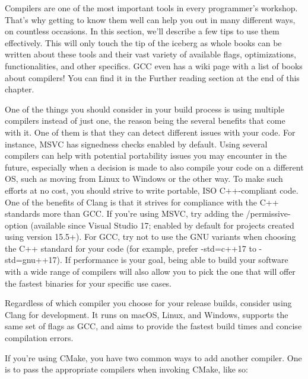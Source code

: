 
Compilers are one of the most important tools in every programmer's workshop. That's why getting to know them well can help you out in many different ways, on countless occasions. In this section, we'll describe a few tips to use them effectively. This will only touch the tip of the iceberg as whole books can be written about these tools and their vast variety of available flags, optimizations, functionalities, and other specifics. GCC even has a wiki page with a list of books about compilers! You can find it in the Further reading section at the end of this chapter.


One of the things you should consider in your build process is using multiple compilers instead of just one, the reason being the several benefits that come with it. One of them is that they can detect different issues with your code. For instance, MSVC has signedness checks enabled by default. Using several compilers can help with potential portability issues you may encounter in the future, especially when a decision is made to also compile your code on a different OS, such as moving from Linux to Windows or the other way. To make such efforts at no cost, you should strive to write portable, ISO C++-compliant code. One of the benefits of Clang is that it strives for compliance with the C++ standards more than GCC. If you're using MSVC, try adding the /permissive- option (available since Visual Studio 17; enabled by default for projects created using version 15.5+). For GCC, try not to use the GNU variants when choosing the C++ standard for your code (for example, prefer -std=c++17 to -std=gnu++17). If performance is your goal, being able to build your software with a wide range of compilers will also allow you to pick the one that will offer the fastest binaries for your specific use cases. 

\begin{tcolorbox}[colback=webgreen!5!white,colframe=webgreen!75!black, title=TIP]
\hspace*{0.7cm}Regardless of which compiler you choose for your release builds, consider using Clang for development. It runs on macOS, Linux, and Windows, supports the same set of flags as GCC, and aims to provide the fastest build times and concise compilation errors.
\end{tcolorbox}

If you're using CMake, you have two common ways to add another compiler. One is to pass the appropriate compilers when invoking CMake, like so:

